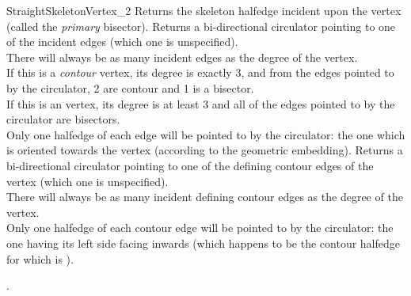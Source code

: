 \begin{ccRefConcept}{StraightSkeletonVertex_2}
\ccAccessFunctions
  \ccGlue
  \ccGlue
  \ccGlue
  \ccGlue
{Returns the skeleton halfedge incident upon the vertex (called the \textit{primary} bisector).}
  \ccGlue
  \ccGlue
{Returns a bi-directional circulator pointing to one of the incident edges (which one is unspecified).\\
There will always be as many incident edges as the degree of the vertex.\\
If this is a \textit{contour} vertex, its degree is exactly 3, and from the edges pointed to by the circulator, 2 are contour and 1 is a bisector.\\
If this is an  vertex, its degree is at least 3 and all of the edges pointed to by the circulator are bisectors.\\
Only one halfedge of each edge will be pointed to by the circulator: the one which is oriented towards the vertex (according to the geometric embedding).}
  \ccGlue
  \ccGlue
{Returns a bi-directional circulator pointing to one of the defining contour edges of the vertex (which one is unspecified).\\
There will always be as many incident defining contour edges as the degree of the vertex.\\
Only one halfedge of each contour edge will be pointed to by the circulator: the one having its left side facing inwards (which happens to be the contour halfedge for which  is ).}


\ccGlue
{}

\ccHasModels

.

\ccSeeAlso

\\
\\
\\
\\

\end{ccRefConcept}

